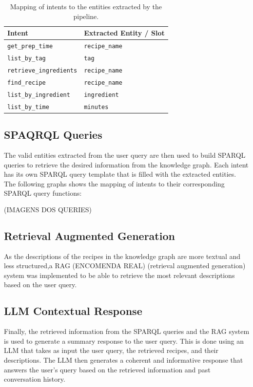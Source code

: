 \documentclass[conference]{IEEEtran}
\begin{document}
\begin{table}[h!]
\centering
\caption{Mapping of intents to the entities extracted by the pipeline.}
\label{tab:intent-to-slots}
\begin{tabularx}{\columnwidth}{@{} l @{\hspace{1.5em}} Y @{}}
	\toprule
	\textbf{Intent} & \textbf{Extracted Entity / Slot} \\
\midrule
	\texttt{get\_prep\_time} & \texttt{recipe\_name} \\
	\texttt{list\_by\_tag} & \texttt{tag} \\
	\texttt{retrieve\_ingredients} & \texttt{recipe\_name} \\
	\texttt{find\_recipe} & \texttt{recipe\_name} \\
	\texttt{list\_by\_ingredient} & \texttt{ingredient} \\
	\texttt{list\_by\_time} & \texttt{minutes} \\
\bottomrule
\end{tabularx}
\end{table}

\subsection{SPAQRQL Queries}

\noindent
The valid entities extracted from the user query are then used to build SPARQL queries to retrieve the desired information from the knowledge graph. Each intent has its own SPARQL query template that is filled with the extracted entities. The following graphs shows the mapping of intents to their corresponding SPARQL query functions:

(IMAGENS DOS QUERIES)

\subsection{Retrieval Augmented Generation}
\noindent
As the descriptions of the recipes in the knowledge graph are more textual and less structured,a RAG (ENCOMENDA REAL) (retrieval augmented generation) system was implemented to be able to retrieve the most relevant descriptions based on the user query.

\subsection{LLM Contextual Response}
\noindent
Finally, the retrieved information from the SPARQL queries and the RAG system is used to generate a summary response to the user query. This is done using an LLM that takes as input the user query, the retrieved recipes, and their descriptions. The LLM then generates a coherent and informative response that answers the user's query based on the retrieved information and past conversation history.
\end{document}
